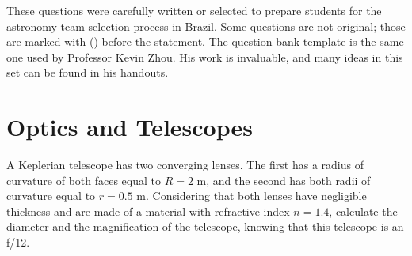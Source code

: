 \documentclass[11pt]{article}
\begin{document}

These questions were carefully written or selected to prepare students for the astronomy team selection process in Brazil. Some questions are not original; those are marked with () before the statement. The question-bank template is the same one used by Professor Kevin Zhou. His work is invaluable, and many ideas in this set can be found in his handouts.




\section{Optics and Telescopes}

    \begin{pproblem} A Keplerian telescope has two converging lenses. The first has a radius of curvature of both faces equal to \(R = 2\text{ m}\), and the second has both radii of curvature equal to \(r = 0.5 \text{ m}\). Considering that both lenses have negligible thickness and are made of a material with refractive index \(n=1.4\), calculate the diameter and the magnification of the telescope, knowing that this telescope is an f/12.
    \end{pproblem}
\end{document}

